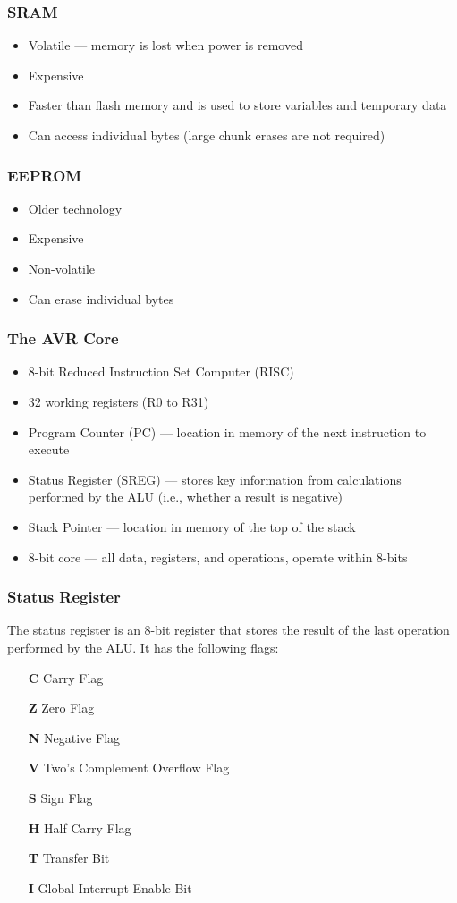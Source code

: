 \documentclass{article}
\begin{document}
\subsubsection{SRAM}
\begin{itemize}
    \item Volatile --- memory is lost when power is removed
    \item Expensive
    \item Faster than flash memory and is used to store variables and
          temporary data
    \item Can access individual bytes (large chunk erases are not
          required)
\end{itemize}
\subsubsection{EEPROM}
\begin{itemize}
    \item Older technology
    \item Expensive
    \item Non-volatile
    \item Can erase individual bytes
\end{itemize}
\subsubsection{The AVR Core}
\begin{itemize}
    \item 8-bit Reduced Instruction Set Computer (RISC)
    \item 32 working registers (R0 to R31)
    \item Program Counter (PC) --- location in memory of the next
          instruction to execute
    \item Status Register (SREG) --- stores key information from
          calculations performed by the ALU (i.e., whether a result is
          negative)
    \item Stack Pointer --- location in memory of the top of the stack
    \item 8-bit core --- all data, registers, and operations, operate within 8-bits
\end{itemize}
\subsubsection{Status Register}
The status register is an 8-bit register that stores the result of the
last operation performed by the ALU. It has the following flags:
\begin{itemize}
    \item[\textbf{C}] Carry Flag
    \item[\textbf{Z}] Zero Flag
    \item[\textbf{N}] Negative Flag
    \item[\textbf{V}] Two's Complement Overflow Flag
    \item[\textbf{S}] Sign Flag
    \item[\textbf{H}] Half Carry Flag
    \item[\textbf{T}] Transfer Bit
    \item[\textbf{I}] Global Interrupt Enable Bit
\end{itemize}
\end{document}

